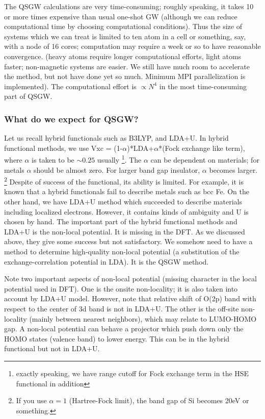 The QSGW calculations are very time-consuming;
roughly speaking, it takes 10 or more times expensive than usual
one-shot GW (although we can reduce computational time by choosing
computational conditions). 
Thus the size of systems which we can treat is limited to ten atom in a
cell or something, say, with a node of 16 cores;
computation may require a week or so to have reasonable convergence.
(heavy atoms require longer computational efforts,
light atoms faster; non-magnetic systems are easier.
We still have much room to accelerate the method, but not have done
yet so much. Minimum MPI parallelization is implemented).
The computational effort is $\propto N^4$ 
in the most time-consuming part of QSGW.


\subsubsection{What do we expect for QSGW?}
Let us recall hybrid functionals such as B3LYP, and LDA+U.
In hybrid functional methods, 
we use Vxc = (1-$\alpha$)*LDA+$\alpha$*(Fock exchange like term),
where $\alpha$ is taken to be $\sim0.25$ usually 
\footnote{exactly speaking, we have range cutoff for Fock exchange term 
in the HSE functional in addition}.
The $\alpha$ can be dependent on materials; for metals $\alpha$ should be
almost zero. For larger band gap insulator, $\alpha$ becomes larger.
\footnote{If you use $\alpha=1$ (Hartree-Fock limit), 
the band gap of Si becomes 20eV or something.}
Despite of success of the functional, its ability is limited.
For example, it is known that a hybrid functionals fail to describe 
metals such as bcc Fe. 
On the other hand, we have LDA+U method which succeeded to describe
materials including localized electrons. However, it contains kinds of
ambiguity and U is chosen by hand.
The important part of the hybrid functional methods and LDA+U
is the non-local potential. It is missing in the DFT.
As we discussed above, they give some success but not satisfactory.
We somehow need to have a method to determine high-quality
non-local potential (a substitution of the exchange-correlation
potential in LDA). It is the QSGW method.

Note two important aspects of non-local potential (missing character 
in the local potential used in DFT). 
One is the onsite non-locality; it is also taken into account by LDA+U
model. However, note that relative shift of O(2p) band with respect
to the center of 3d band is not in LDA+U.
The other is the off-site non-locality (mainly between nearest neighbors),
which may relate to LUMO-HOMO gap. A non-local potential can behave a
projector which push down only the HOMO states (valence band) to lower energy.
This can be in the hybrid functional but not in LDA+U. 

